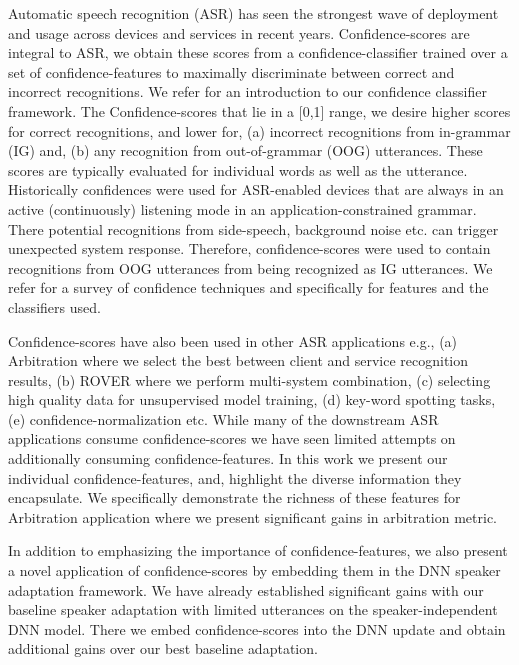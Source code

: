 Automatic speech recognition (ASR) has seen the strongest wave of deployment and usage across devices and services in recent years. Confidence-scores are integral to ASR, we obtain these scores from a confidence-classifier trained over a set of confidence-features to maximally discriminate between correct and incorrect recognitions. We refer \cite{Posen1} for an introduction to our confidence classifier framework. The Confidence-scores that lie in a [0,1] range, we desire higher scores for correct recognitions, and lower for, (a) incorrect recognitions from in-grammar (IG) and, (b) any recognition from out-of-grammar (OOG) utterances. These scores are typically evaluated for individual words as well as the utterance. Historically confidences were used for ASR-enabled devices that are always in an active (continuously) listening mode in an application-constrained grammar. There potential recognitions from side-speech, background noise etc. can trigger unexpected system response. Therefore, confidence-scores were used to contain recognitions from OOG utterances from being recognized as IG utterances. We refer \cite{CMsurvey_Jiang_SpeechCommunication06, NBest_Wessel_Eurospeech99, MaximumEntropyConfidence_White_ICASSP07,Blatz04confidenceestimation,Rose_UV_1995,Mathan_Rejection_1991,Sukkar_UV_1996} for a survey of confidence techniques and specifically \cite{WordLattice_Kemp_Eurospeech97, MaximumEntropyConfidence_White_ICASSP07, Wessel01ney,Chase_wordand,Weintraub97}
for features and the classifiers used.

Confidence-scores have also been used in other ASR applications {e.g.}, (a) Arbitration where we select the best between client and service recognition results, (b) ROVER where we perform multi-system combination, (c) selecting high quality data for unsupervised model training, (d) key-word spotting tasks, (e) confidence-normalization etc. While many of the downstream ASR applications consume confidence-scores we have seen limited attempts on additionally consuming confidence-features. In this work we present our individual confidence-features, and, highlight the diverse information they encapsulate. We specifically demonstrate the richness of these features for Arbitration application where we present significant gains in arbitration metric. 

In addition to emphasizing the importance of confidence-features, we also present a novel application of confidence-scores by embedding them in the DNN speaker adaptation framework. We have already established significant gains with our baseline speaker adaptation with limited utterances on the speaker-independent DNN model. There we embed confidence-scores into the DNN update and obtain additional gains over our best baseline adaptation.

